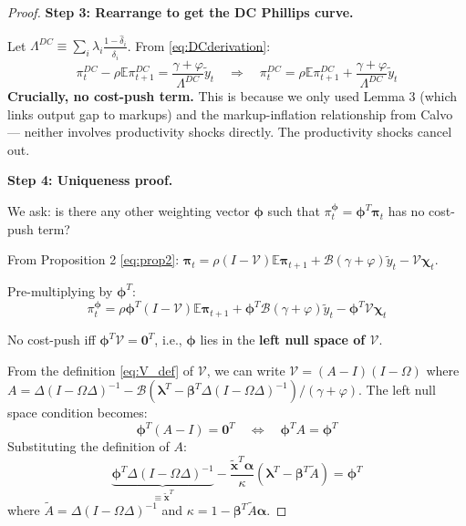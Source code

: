 \documentclass[12pt]{article}
\begin{document}
\begin{proof}
\medskip
\textbf{Step 3: Rearrange to get the DC Phillips curve.}

Let $\Lambda^{DC} \equiv \sum_i \lambda_i \frac{1-\hat{\delta}_i}{\hat{\delta}_i}$. From \eqref{eq:DCderivation}:
\begin{equation}
    \pi_t^{DC} - \rho\mathbb{E}\pi_{t+1}^{DC} = \frac{\gamma+\varphi}{\Lambda^{DC}}\tilde{y}_t
    \quad \Rightarrow \quad
    \pi_t^{DC} = \rho\mathbb{E}\pi_{t+1}^{DC} + \frac{\gamma+\varphi}{\Lambda^{DC}}\tilde{y}_t
\end{equation}
\textbf{Crucially, no cost-push term.} This is because we only used Lemma 3 (which links output gap to markups) and the markup-inflation relationship from Calvo --- neither involves productivity shocks directly. The productivity shocks cancel out.

\medskip
\textbf{Step 4: Uniqueness proof.}

We ask: is there any other weighting vector $\bm{\phi}$ such that $\pi_t^{\bm{\phi}} = \bm{\phi}^T\bm{\pi}_t$ has no cost-push term?

From Proposition 2 \eqref{eq:prop2}: $\bm{\pi}_t = \rho(I-\mathcal{V})\mathbb{E}\bm{\pi}_{t+1} + \mathcal{B}(\gamma+\varphi)\tilde{y}_t - \mathcal{V}\bm{\chi}_t$.

Pre-multiplying by $\bm{\phi}^T$:
\begin{equation}
    \pi_t^{\bm{\phi}} = \rho\bm{\phi}^T(I-\mathcal{V})\mathbb{E}\bm{\pi}_{t+1} + \bm{\phi}^T\mathcal{B}(\gamma+\varphi)\tilde{y}_t - \bm{\phi}^T\mathcal{V}\bm{\chi}_t
\end{equation}

No cost-push iff $\bm{\phi}^T\mathcal{V} = \mathbf{0}^T$, i.e., $\bm{\phi}$ lies in the \textbf{left null space of $\mathcal{V}$}.

From the definition \eqref{eq:V_def} of $\mathcal{V}$, we can write $\mathcal{V} = (A - I)(I-\Omega)$ where $A = \Delta(I-\Omega\Delta)^{-1} - \mathcal{B}(\bm{\lambda}^T - \bm{\beta}^T\Delta(I-\Omega\Delta)^{-1})/(\gamma+\varphi)$. The left null space condition becomes:
\begin{equation}
    \bm{\phi}^T(A - I) = \mathbf{0}^T \quad \Leftrightarrow \quad \bm{\phi}^T A = \bm{\phi}^T
    \label{eq:nullspace}
\end{equation}
Substituting the definition of $A$:
\begin{equation}
    \underbrace{\bm{\phi}^T\Delta(I-\Omega\Delta)^{-1}}_{\equiv\tilde{\bm{x}}^T} - \frac{\tilde{\bm{x}}^T\bm{\alpha}}{\kappa}(\bm{\lambda}^T - \bm{\beta}^T\tilde{A}) = \bm{\phi}^T
\end{equation}
where $\tilde{A} = \Delta(I-\Omega\Delta)^{-1}$ and $\kappa = 1-\bm{\beta}^T\tilde{A}\bm{\alpha}$.


\end{proof}
\end{document}
